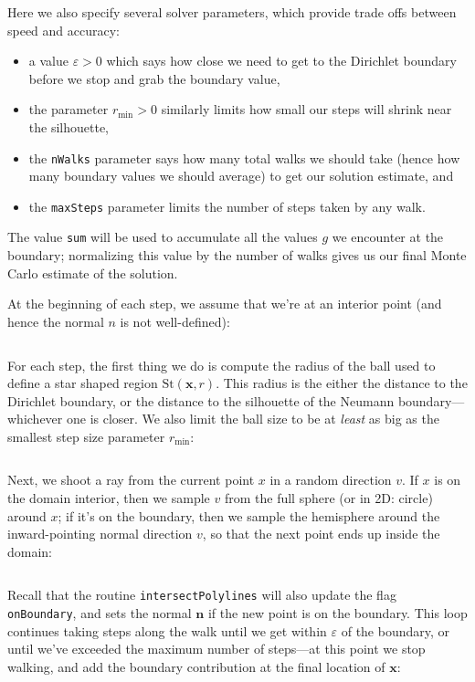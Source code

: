 \documentclass{article}
\newcommand{\code}[1]{\texttt{#1}}
\newcommand{\St}{\text{St}}
\renewcommand{\vec}[1]{\textbf{#1}}
\begin{document}
Here we also specify several solver parameters, which provide trade offs between speed and accuracy:
\begin{itemize}
   \item a value \(\varepsilon > 0\) which says how close we need to get to the Dirichlet boundary before we stop and grab the boundary value,
   \item the parameter \(r_{\min} > 0\) similarly limits how small our steps will shrink near the silhouette,
   \item the \code{nWalks} parameter says how many total walks we should take (hence how many boundary values we should average) to get our solution estimate, and
   \item the \code{maxSteps} parameter limits the number of steps taken by any walk.
\end{itemize}
The value \code{sum} will be used to accumulate all the values \(g\) we encounter at the boundary; normalizing this value by the number of walks gives us our final Monte Carlo estimate of the solution.  

At the beginning of each step, we assume that we're at an interior point (and hence the normal \(n\) is not well-defined):

\inputminted[fontsize=\small,linenos,firstline=128,lastline=131,bgcolor=bg]{cpp}{../code/WoStLaplace2D.cpp}

For each step, the first thing we do is compute the radius of the ball used to define a star shaped region \(\St(\vec{x},r)\).  This radius is the either the distance to the Dirichlet boundary, or the distance to the silhouette of the Neumann boundary---whichever one is closer.  We also limit the ball size to be at \emph{least} as big as the smallest step size parameter \(r_{\min}\):

\inputminted[fontsize=\small,linenos,firstline=133,lastline=140,bgcolor=bg]{cpp}{../code/WoStLaplace2D.cpp}

Next, we shoot a ray from the current point \(x\) in a random direction \(v\).  If \(x\) is on the domain interior, then we sample \(v\) from the full sphere (or in 2D: circle) around \(x\); if it's on the boundary, then we sample the hemisphere around the inward-pointing normal direction \(v\), so that the next point ends up inside the domain:

\inputminted[fontsize=\small,linenos,firstline=142,lastline=148,bgcolor=bg]{cpp}{../code/WoStLaplace2D.cpp}

Recall that the routine \code{intersectPolylines} will also update the flag \code{onBoundary}, and sets the normal \(\vec{n}\) if the new point is on the boundary.  This loop continues taking steps along the walk until we get within \(\varepsilon\) of the boundary, or until we've exceeded the maximum number of steps---at this point we stop walking, and add the boundary contribution at the final location of \(\vec{x}\):
\end{document}
